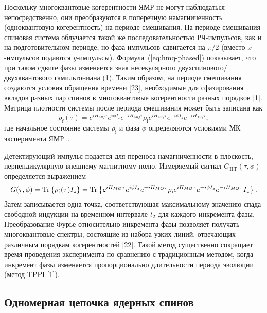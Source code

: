 Поскольку многоквантовые когерентности ЯМР не могут наблюдаться непосредственно, они преобразуются в поперечную намагниченность (одноквантовую когерентность) на периоде смешивания. На периоде смешивания спиновая система облучается такой же последовательностью РЧ-импульсов, как и на подготовительном периоде, но фаза импульсов сдвигается на $\pi/2$
(вместо $x$-импульсов подаются  $y$-импульсы).
Формула~(\ref{eq:hmq-phased}) показывает, что при таком сдвиге фазы изменяется знак несекулярного двухспинового/двухквантового гамильтониана (1). Таким образом, на периоде смешивания создаются условия обращения времени [23], необходимые для сфазирования вкладов разных пар спинов в многоквантовые когерентности разных порядков [1].
%
Матрица плотности системы после периода смешивания может быть записана как \cite{Baum1985}
\begin{equation}\label{eq:rho-after-mixing}
  \rho_\mathrm{f}(\tau)
  = e^{i{H_{MQ}}\tau} e^{i\phi I_z} e^{-i{ H_{MQ}}\tau}
  \rho_\mathrm{i}
  e^{i{ H_{MQ}}\tau} e^{-i\phi I_z} e^{-i{H_{MQ}}\tau} ,
\end{equation}
где начальное состояние системы $\rho_\mathrm{i}$
и фаза $\phi$ определяются условиями МК эксперимента ЯМР~\cite{Baum1985}.

Детектирующий импульс подается для переноса намагниченности в плоскость, перпендикулярную внешнему магнитному полю.
Измеряемый сигнал $G_\mathrm{HT}(\tau, \phi)$ определяется выражением
\begin{equation}\label{eq:signal-after-mixing}
  G(\tau, \phi)
  = \mathrm{Tr} \left\{ \rho_\mathrm{f}(\tau) I_z \right\}
  = \mathrm{Tr} \left\{ 
    e^{iH_{MQ}\tau}e^{i\phi I_z}e^{-iH_{MQ}\tau}
    \rho_\mathrm{i}
    e^{iH_{MQ}\tau}e^{-i\phi I_z}e^{-iH_{MQ}\tau}
    I_z
   \right\}.
\end{equation}
%
Затем записывается одна точка, соответствующая максимальному значению спада свободной индукции на временном интервале $t_2$ для каждого инкремента фазы. Преобразование Фурье относительно инкремента фазы позволяет получать многоквантовые спектры, состоящие из набора узких линий, отвечающих различным порядкам когерентностей [22]. Такой метод существенно сокращает время проведения эксперимента по сравнению с традиционным методом, когда инкремент фазы изменяется пропорционально длительности периода эволюции (метод TPPI [1]).



\subsection{Одномерная цепочка ядерных спинов}

